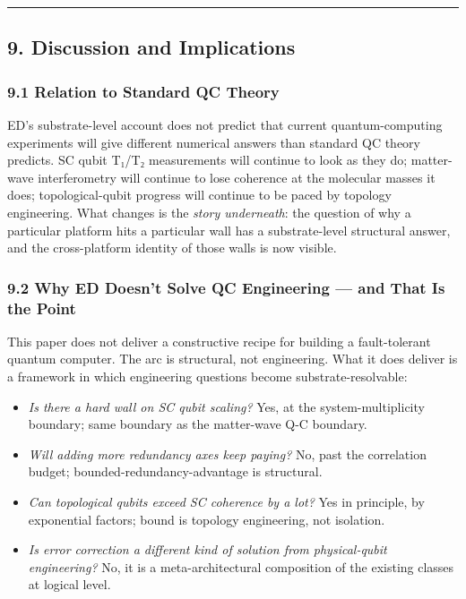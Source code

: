 \documentclass[
  11pt,
  a4paper,
]{article}
\providecommand{\tightlist}{%
  \setlength{\itemsep}{0pt}\setlength{\parskip}{0pt}}
\begin{document}
\begin{center}\rule{0.5\linewidth}{0.5pt}\end{center}

\subsection{9. Discussion and
Implications}\label{discussion-and-implications}

\subsubsection{9.1 Relation to Standard QC
Theory}\label{relation-to-standard-qc-theory}

ED's substrate-level account does not predict that current
quantum-computing experiments will give different numerical answers than
standard QC theory predicts. SC qubit T₁/T₂ measurements will continue
to look as they do; matter-wave interferometry will continue to lose
coherence at the molecular masses it does; topological-qubit progress
will continue to be paced by topology engineering. What changes is the
\emph{story underneath}: the question of why a particular platform hits
a particular wall has a substrate-level structural answer, and the
cross-platform identity of those walls is now visible.

\subsubsection{9.2 Why ED Doesn't Solve QC Engineering --- and That Is
the
Point}\label{why-ed-doesnt-solve-qc-engineering-and-that-is-the-point}

This paper does not deliver a constructive recipe for building a
fault-tolerant quantum computer. The arc is structural, not engineering.
What it does deliver is a framework in which engineering questions
become substrate-resolvable:

\begin{itemize}
\tightlist
\item
  \emph{Is there a hard wall on SC qubit scaling?} Yes, at the
  system-multiplicity boundary; same boundary as the matter-wave Q-C
  boundary.
\item
  \emph{Will adding more redundancy axes keep paying?} No, past the
  correlation budget; bounded-redundancy-advantage is structural.
\item
  \emph{Can topological qubits exceed SC coherence by a lot?} Yes in
  principle, by exponential factors; bound is topology engineering, not
  isolation.
\item
  \emph{Is error correction a different kind of solution from
  physical-qubit engineering?} No, it is a meta-architectural
  composition of the existing classes at logical level.
\end{itemize}
\end{document}
